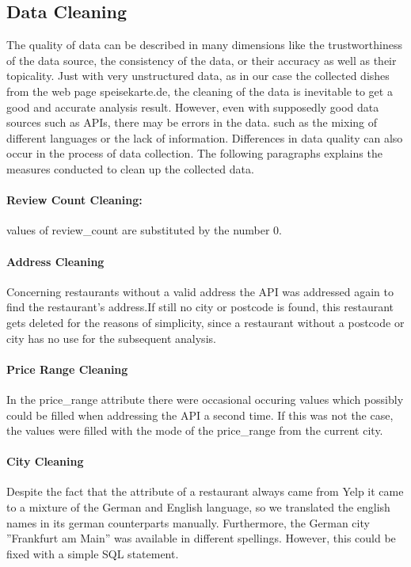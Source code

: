 \subsection{Data Cleaning}
\label{subsec:cleaning}
The quality of data can be described in many dimensions like \eg{} the trustworthiness of the data source, the consistency of the data,
or their accuracy as well as their topicality. %
Just with very unstructured data, as in our case the collected dishes from the web page speisekarte.de, the cleaning of the data is
inevitable to get a good and accurate analysis result.
However, even with supposedly good data sources such as \acp{API}, there may be errors in the data.
such as \eg{} the mixing of different languages or the lack of information.
Differences in data quality can also occur in the process of data collection.
\newline
The following paragraphs explains the measures conducted to clean up the collected data.
\paragraph{Review Count Cleaning:}  values of review\_count are substituted by the number 0.
\paragraph{Address Cleaning}
Concerning restaurants without a valid address the \ylp{} \ac{API} was addressed again to find the restaurant's address.If still no city or postcode is found, this restaurant gets deleted for the reasons of simplicity, since a restaurant without a postcode or city has no use for the subsequent analysis.
\paragraph{Price Range Cleaning}
In the price\_range attribute there were occasional occuring  values which possibly could be filled when addressing the \ylp{} \ac{API} a second time.
If this was not the case, the  values were filled with the mode of the price\_range from the current city.
\paragraph{City Cleaning}
Despite the fact that the  attribute of a restaurant always came from Yelp it came to a mixture of the German and English language,
so we translated the english names in its german counterparts manually.
Furthermore, the German city ''Frankfurt am Main'' was available in different spellings.
However, this could be fixed with a simple \ac{SQL} statement.
